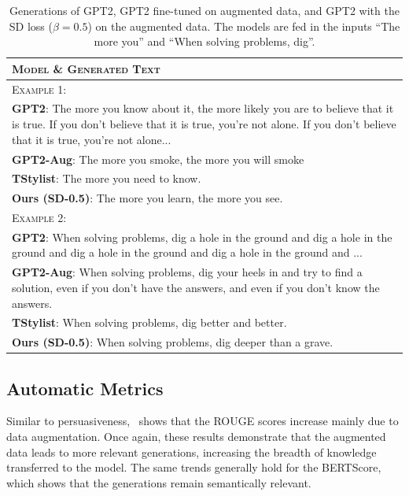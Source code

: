   \begin{table}[htb]
  \small
  \centering
  
  \begin{tabularx}{\linewidth}{@{}>{\raggedright\arraybackslash}X@{}}
  \caption{Generations of GPT2, GPT2 fine-tuned on augmented data, and GPT2 with the SD loss ($\beta=0.5$) on the augmented data. The models are fed in the inputs ``The more you'' and ``When solving problems, dig''.}
  \label{tab:example_the_more}
   \toprule[1.5pt]
  \textsc{Model} \& \textsc{Generated Text}\\
  \midrule[0.75pt]
  \textsc{Example 1:}\\
  \textbf{GPT2}:  The more you know about it, the more likely you are to believe that it is true. If you don't believe that it is true, you're not alone. If you don't believe that it is true, you're not alone... \\
  \textbf{GPT2-Aug}: The more you smoke, the more you will smoke  \\
  \textbf{TStylist}: The more you need to know. \\
  \textbf{Ours (SD-0.5)}: The more you learn, the more you see.  \\
  \addlinespace[0.5em]
  \textsc{Example 2:}\\
  \textbf{GPT2}: When solving problems, dig a hole in the ground and dig a hole in the ground and dig a hole in the ground and dig a hole in the ground and ...    \\
  \textbf{GPT2-Aug}: When solving problems, dig your heels in and try to find a solution, even if you don't have the answers, and even if you don't know the answers. \\
  \textbf{TStylist}: When solving problems, dig better and better.\\
  \textbf{Ours (SD-0.5)}: When solving problems, dig deeper than a grave.   \\
  \bottomrule[1.5pt]

  \end{tabularx}
  \end{table}
  
\vspace{-0.25in}

 \subsection{Automatic Metrics}
 \label{subsec:si_mem_auto}
Similar to persuasiveness,~ shows that the ROUGE scores increase mainly due to data augmentation. Once again, these results demonstrate that the augmented data leads to more relevant generations, increasing the breadth of knowledge transferred to the model. The same trends generally hold for the BERTScore, which shows that the generations remain semantically relevant.

